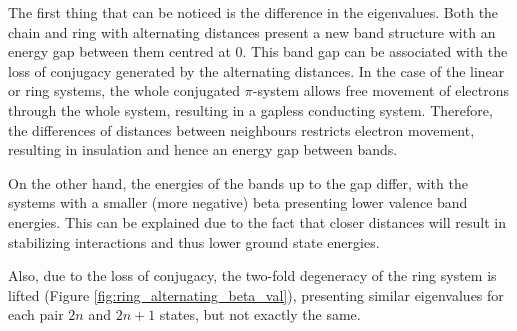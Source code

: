 \documentclass[twocolumn]{article}
\begin{document}
The first thing that can be noticed is the difference in the eigenvalues. Both the chain and ring with alternating distances present a new band structure with an energy gap between them centred at $0$. This band gap can be associated with the loss of conjugacy generated by the alternating distances. In the case of the linear or ring systems, the whole conjugated $\pi$-system allows free movement of electrons through the whole system, resulting in a gapless conducting system. Therefore, the differences of distances between neighbours restricts electron movement, resulting in insulation and hence an energy gap between bands. 

On the other hand, the energies of the bands up to the gap differ, with the systems with a smaller (more negative) beta presenting lower valence band energies. This can be explained due to the fact that closer distances will result in stabilizing interactions and thus lower ground state energies. 

Also, due to the loss of conjugacy, the two-fold degeneracy of the ring system is lifted (Figure \ref{fig:ring_alternating_beta_val}), presenting similar eigenvalues for each pair $2n$ and $2n+1$ states, but not exactly the same.
\end{document}
